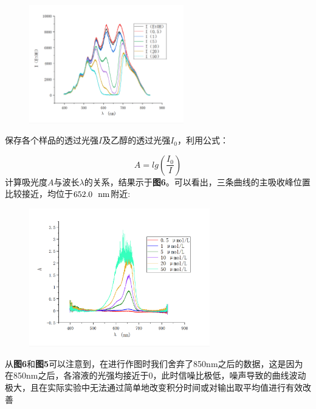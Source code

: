 \documentclass[12pt]{article}
\begin{document}
			\begin{figure}[h]
				\centering
				\includegraphics[width=0.6\textwidth]{5.png}
			\end{figure}
			\par

			保存各个样品的透过光强$I$及乙醇的透过光强$I_{0}$，利用公式：\par
			$$
			A=lg(\frac{I_{0}}{I})
			$$
			计算吸光度$A$与波长$\lambda$的关系，结果示于\textbf{图6}。可以看出，三条曲线的主吸收峰位置比较接近，均位于$652.0\ \ {\rm nm}$附近:
			\begin{figure}[h]
				\centering
				\includegraphics[width=0.70\textwidth]{6.png}
			\end{figure}
			\par
			从\textbf{图6}和\textbf{图5}可以注意到，在进行作图时我们舍弃了850nm之后的数据，这是因为在850nm之后，各溶液的光强均接近于0，此时信噪比极低，噪声导致的曲线波动极大，且在实际实验中无法通过简单地改变积分时间或对输出取平均值进行有效改善\par
\end{document}
